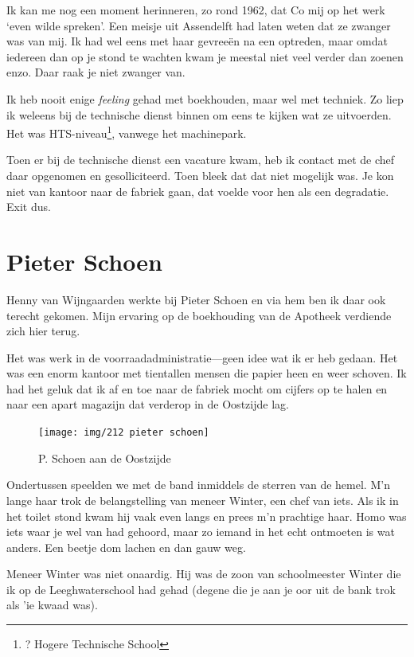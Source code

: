 \documentclass[10pt,twoside, openright]{memoir}
\begin{document}
Ik kan me nog een moment herinneren, zo rond 1962, dat Co mij op het werk `even wilde spreken'. Een meisje uit Assendelft had laten weten dat ze zwanger was van mij. Ik had wel eens met haar gevreeën na een optreden, maar omdat iedereen dan op je stond te wachten kwam je meestal niet veel verder dan zoenen enzo. Daar raak je niet zwanger van. 

Ik heb nooit enige \emph{feeling} gehad met boekhouden, maar wel met techniek. Zo liep ik weleens bij de technische dienst binnen om eens te kijken wat ze uitvoerden. Het was HTS-niveau\footnote{? Hogere Technische School}, vanwege het machinepark. 

Toen er bij de technische dienst een vacature kwam, heb ik contact met de chef daar opgenomen en gesolliciteerd. Toen bleek dat dat niet mogelijk was. Je kon niet van kantoor naar de fabriek gaan, dat voelde voor hen als een degradatie. Exit dus.

\section{Pieter Schoen} %
\label{cha:schoen}

Henny van Wijngaarden werkte bij Pieter Schoen en via hem ben ik daar ook terecht gekomen. Mijn ervaring op de boekhouding van de Apotheek verdiende zich hier terug.

Het was werk in de voorraadadministratie---geen idee wat ik er heb gedaan. Het was een enorm kantoor met tientallen mensen die papier heen en weer schoven. Ik had het geluk dat ik af en toe naar de fabriek mocht om cijfers op te halen en naar een apart magazijn dat verderop in de Oostzijde lag. 

\begin{figure}
\texttt{[image: img/212 pieter schoen]}
\caption*{\footnotesize P. Schoen aan de Oostzijde}
\end{figure}

Ondertussen speelden we met de band inmiddels de sterren van de hemel. M’n lange haar trok de belangstelling van meneer Winter, een chef van iets. Als ik in het toilet stond kwam hij vaak even langs en prees m’n prachtige haar. Homo was iets waar je wel van had gehoord, maar zo iemand in het echt ontmoeten is wat anders. Een beetje dom lachen en dan gauw weg. 

Meneer Winter was niet onaardig. Hij was de zoon van schoolmeester Winter die ik op de Leeghwaterschool had gehad (degene die je aan je oor uit de bank trok als 'ie kwaad was). 
\end{document}
